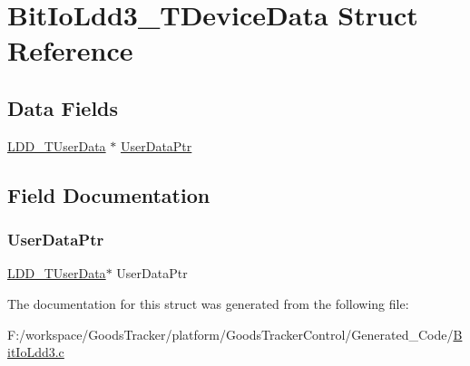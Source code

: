 \hypertarget{struct_bit_io_ldd3___t_device_data}{}\section{Bit\+Io\+Ldd3\+\_\+\+T\+Device\+Data Struct Reference}
\label{struct_bit_io_ldd3___t_device_data}
\subsection*{Data Fields}
\begin{DoxyCompactItemize}
\item 
\hyperlink{group___p_e___types__module_ga0b66a73f87238a782318aa0be7578e35}{L\+D\+D\+\_\+\+T\+User\+Data} $\ast$ \hyperlink{struct_bit_io_ldd3___t_device_data_a8e77b9d030b00c231823350a904e0f83}{User\+Data\+Ptr}
\end{DoxyCompactItemize}


\subsection{Field Documentation}
\mbox{\label{struct_bit_io_ldd3___t_device_data_a8e77b9d030b00c231823350a904e0f83}} 
\subsubsection{\texorpdfstring{User\+Data\+Ptr}{UserDataPtr}}
{\footnotesize\ttfamily \hyperlink{group___p_e___types__module_ga0b66a73f87238a782318aa0be7578e35}{L\+D\+D\+\_\+\+T\+User\+Data}$\ast$ User\+Data\+Ptr}



The documentation for this struct was generated from the following file\+:\begin{DoxyCompactItemize}
\item 
F\+:/workspace/\+Goods\+Tracker/platform/\+Goods\+Tracker\+Control/\+Generated\+\_\+\+Code/\hyperlink{_bit_io_ldd3_8c}{Bit\+Io\+Ldd3.\+c}\end{DoxyCompactItemize}
